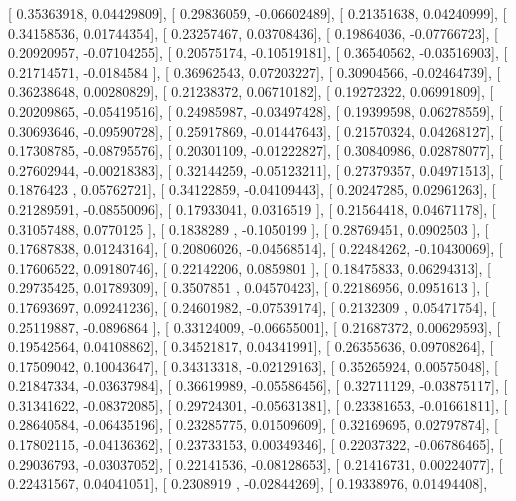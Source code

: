 \documentclass{article}
\begin{document}
       [ 0.35363918,  0.04429809],
       [ 0.29836059, -0.06602489],
       [ 0.21351638,  0.04240999],
       [ 0.34158536,  0.01744354],
       [ 0.23257467,  0.03708436],
       [ 0.19864036, -0.07766723],
       [ 0.20920957, -0.07104255],
       [ 0.20575174, -0.10519181],
       [ 0.36540562, -0.03516903],
       [ 0.21714571, -0.0184584 ],
       [ 0.36962543,  0.07203227],
       [ 0.30904566, -0.02464739],
       [ 0.36238648,  0.00280829],
       [ 0.21238372,  0.06710182],
       [ 0.19272322,  0.06991809],
       [ 0.20209865, -0.05419516],
       [ 0.24985987, -0.03497428],
       [ 0.19399598,  0.06278559],
       [ 0.30693646, -0.09590728],
       [ 0.25917869, -0.01447643],
       [ 0.21570324,  0.04268127],
       [ 0.17308785, -0.08795576],
       [ 0.20301109, -0.01222827],
       [ 0.30840986,  0.02878077],
       [ 0.27602944, -0.00218383],
       [ 0.32144259, -0.05123211],
       [ 0.27379357,  0.04971513],
       [ 0.1876423 ,  0.05762721],
       [ 0.34122859, -0.04109443],
       [ 0.20247285,  0.02961263],
       [ 0.21289591, -0.08550096],
       [ 0.17933041,  0.0316519 ],
       [ 0.21564418,  0.04671178],
       [ 0.31057488,  0.0770125 ],
       [ 0.1838289 , -0.1050199 ],
       [ 0.28769451,  0.0902503 ],
       [ 0.17687838,  0.01243164],
       [ 0.20806026, -0.04568514],
       [ 0.22484262, -0.10430069],
       [ 0.17606522,  0.09180746],
       [ 0.22142206,  0.0859801 ],
       [ 0.18475833,  0.06294313],
       [ 0.29735425,  0.01789309],
       [ 0.3507851 ,  0.04570423],
       [ 0.22186956,  0.0951613 ],
       [ 0.17693697,  0.09241236],
       [ 0.24601982, -0.07539174],
       [ 0.2132309 ,  0.05471754],
       [ 0.25119887, -0.0896864 ],
       [ 0.33124009, -0.06655001],
       [ 0.21687372,  0.00629593],
       [ 0.19542564,  0.04108862],
       [ 0.34521817,  0.04341991],
       [ 0.26355636,  0.09708264],
       [ 0.17509042,  0.10043647],
       [ 0.34313318, -0.02129163],
       [ 0.35265924,  0.00575048],
       [ 0.21847334, -0.03637984],
       [ 0.36619989, -0.05586456],
       [ 0.32711129, -0.03875117],
       [ 0.31341622, -0.08372085],
       [ 0.29724301, -0.05631381],
       [ 0.23381653, -0.01661811],
       [ 0.28640584, -0.06435196],
       [ 0.23285775,  0.01509609],
       [ 0.32169695,  0.02797874],
       [ 0.17802115, -0.04136362],
       [ 0.23733153,  0.00349346],
       [ 0.22037322, -0.06786465],
       [ 0.29036793, -0.03037052],
       [ 0.22141536, -0.08128653],
       [ 0.21416731,  0.00224077],
       [ 0.22431567,  0.04041051],
       [ 0.2308919 , -0.02844269],
       [ 0.19338976,  0.01494408],
\end{document}
